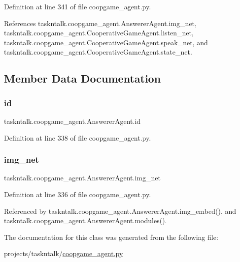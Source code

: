 Definition at line 341 of file coopgame\+\_\+agent.\+py.



References taskntalk.\+coopgame\+\_\+agent.\+Answerer\+Agent.\+img\+\_\+net, taskntalk.\+coopgame\+\_\+agent.\+Cooperative\+Game\+Agent.\+listen\+\_\+net, taskntalk.\+coopgame\+\_\+agent.\+Cooperative\+Game\+Agent.\+speak\+\_\+net, and taskntalk.\+coopgame\+\_\+agent.\+Cooperative\+Game\+Agent.\+state\+\_\+net.



\subsection{Member Data Documentation}
\mbox{\label{classtaskntalk_1_1coopgame__agent_1_1AnswererAgent_a3396232d3c8bf7d42173afdae93c2728}} 
\subsubsection{\texorpdfstring{id}{id}}
{\footnotesize\ttfamily taskntalk.\+coopgame\+\_\+agent.\+Answerer\+Agent.\+id}



Definition at line 338 of file coopgame\+\_\+agent.\+py.

\mbox{\label{classtaskntalk_1_1coopgame__agent_1_1AnswererAgent_ace4615b6098d316db88536685aa46487}} 
\subsubsection{\texorpdfstring{img\+\_\+net}{img\_net}}
{\footnotesize\ttfamily taskntalk.\+coopgame\+\_\+agent.\+Answerer\+Agent.\+img\+\_\+net}



Definition at line 336 of file coopgame\+\_\+agent.\+py.



Referenced by taskntalk.\+coopgame\+\_\+agent.\+Answerer\+Agent.\+img\+\_\+embed(), and taskntalk.\+coopgame\+\_\+agent.\+Answerer\+Agent.\+modules().



The documentation for this class was generated from the following file\+:\begin{DoxyCompactItemize}
\item 
projects/taskntalk/\hyperlink{coopgame__agent_8py}{coopgame\+\_\+agent.\+py}\end{DoxyCompactItemize}
